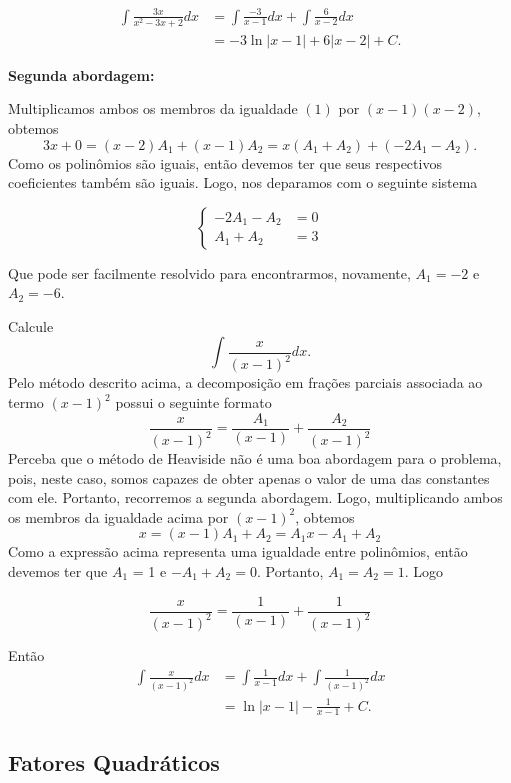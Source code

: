 \begin{ex}
		\[\begin{split}
			\int\frac{3x}{x^2 -3x + 2}dx &= \int \frac{-3}{x-1}dx + \int \frac{6}{x-2}dx \\
			&= -3 \ln \left|x-1\right| + 6\left|x-2\right| + C.
		\end{split}\]
		
		
		\begin{flushleft}
			\textbf{Segunda abordagem:}
		\end{flushleft}
		
		Multiplicamos ambos os membros da igualdade $(1)$ por $(x-1)(x-2)$, obtemos
		$$3x + 0 = (x-2)A_1 + (x-1)A_2 = x(A_1 + A_2) + (-2A_1 - A_2).$$
		Como os polinômios são iguais, então devemos ter que seus respectivos coeficientes também são iguais. Logo, nos deparamos com o seguinte sistema 
			
		\[
		\begin{cases}
			-2A_1 - A_2 &= 0 \\
		 	 A_1 + A_2 &= 3
		\end{cases}
		\]
		
 	Que pode ser facilmente resolvido para encontrarmos, novamente, $A_1 = -2$ e $A_2 =- 6$. 
	\end{ex}
	
	\begin{ex}
		Calcule $$\int \frac{x}{(x-1)^2}dx.$$ 
		 Pelo método descrito acima, a decomposição em frações parciais associada ao termo $(x-1)^2$ possui o seguinte formato 
		$$ \frac{x}{(x-1)^2} = \frac{A_1}{(x-1)} + \frac{A_2}{(x-1)^2}$$ 
		Perceba que o método de Heaviside não é uma boa abordagem para o problema, pois, neste caso, somos capazes de obter apenas o valor de uma das constantes com ele. Portanto, recorremos a segunda abordagem. Logo, multiplicando ambos os membros da igualdade acima por $(x-1)^2$, obtemos
		$$x = (x-1)A_1 + A_2 = A_1x - A_1+ A_2$$
		Como a expressão acima representa uma igualdade entre polinômios, então devemos ter que $A_1$ = 1 e $-A_1 + A_2 = 0$. Portanto, $A_1 = A_2 = 1$. Logo 
		
		$$ \frac{x}{(x-1)^2} = \frac{1}{(x-1)} + \frac{1}{(x-1)^2}$$ 
		
		Então
		\[\begin{split}
			\int \frac{x}{(x-1)^2}dx &= \int\frac{1}{x-1}dx + \int \frac{1}{(x-1)^2}dx \\
			&= \ln \left|x-1\right| - \frac{1}{x-1} + C.
		\end{split}\]
	\end{ex}
	
	\subsection*{Fatores Quadráticos}
	 
